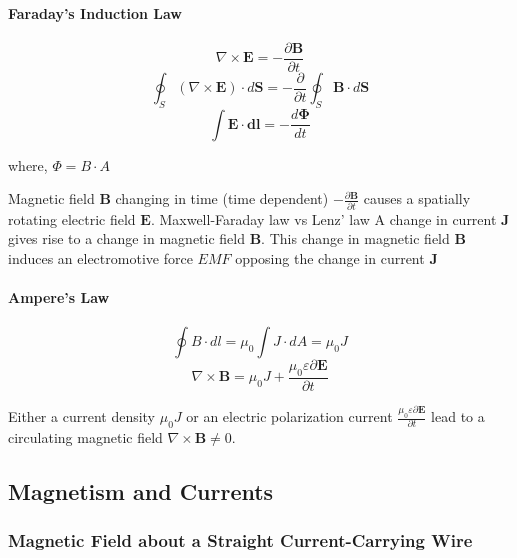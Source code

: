 \paragraph{Faraday's Induction Law}
\begin{equation}
	\nabla \times \textbf{E} = -\frac{\partial \textbf{B}}{\partial t}
\end{equation}
\begin{equation}
	\oint_{S} (\nabla \times \textbf{E}) \cdot d\mathbf{S} = -\frac{\partial}{\partial t} \oint_{S} \mathbf{B} \cdot d\mathbf{S}
\end{equation}
\begin{equation}
	\int \textbf{E} \cdot \textbf{dl}= -\frac{d \mathbf{\Phi}}{d t}
\end{equation}

where, $\Phi = B \cdot A$

	Magnetic field $\textbf{B}$ changing in time (time dependent) $-\frac{\partial \textbf{B}}{\partial t}$ causes a spatially rotating electric field $\textbf{E}$.
	Maxwell-Faraday law vs Lenz' law
	A change in current $\textbf{J}$ gives rise to a change in magnetic field $\textbf{B}$. This change in magnetic field $\textbf{B}$ induces an electromotive force $EMF$ opposing the change in current $\textbf{J}$

	
\paragraph{Ampere's Law}
\begin{equation}
	\oint B \cdot dl = \mu_{0} \int J \cdot dA = \mu_{0}J
	\label{eq:AmperesLaw}
\end{equation}
\begin{equation}
	\nabla \times \textbf{B} = \mu_{0}J+\frac{\mu_{0}\varepsilon\partial \textbf{E}}{\partial t}
\end{equation}

Either a current density $\mu_{0}J$ or an electric polarization current $\frac{\mu_{0}\varepsilon\partial \textbf{E}}{\partial t}$ lead to a circulating magnetic field $\nabla \times \textbf{B} \neq 0$.



\subsection{Magnetism and Currents}
\subsubsection{Magnetic Field about a Straight Current-Carrying Wire}

